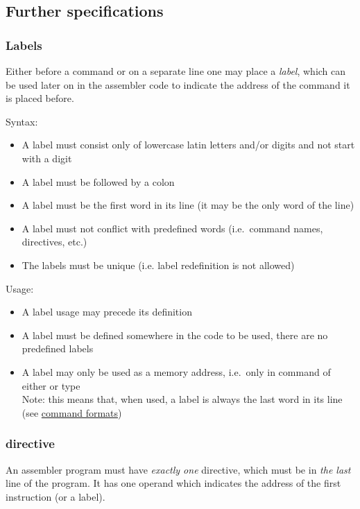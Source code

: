 \subsection{Further specifications}

\subsubsection{Labels}

Either before a command or on a separate line one may place a \textit{label}, which can be used later on in the assembler code to indicate the address of the command it is placed before.

Syntax:

\begin{itemize}
    \item A label must consist only of lowercase latin letters and/or digits and not start with a digit
    \item A label must be followed by a colon
    \item A label must be the first word in its line (it may be the only word of the line)
    \item A label must not conflict with predefined words (i.e.\ command names, directives, etc.)
    \item The labels must be unique (i.e. label redefinition is not allowed)
\end{itemize}

Usage:

\begin{itemize}
    \item A label usage may precede its definition
    \item A label must be defined somewhere in the code to be used, there are no predefined labels
    \item A label may only be used as a memory address, i.e.\ only in command of either  or  type\\
    Note: this means that, when used, a label is always the last word in its line (see \hyperlink{command:formats}{command formats})
\end{itemize}

\subsubsection{ directive}

An assembler program must have \textit{exactly one}  directive, which must be in \textit{the last} line of the program.
It has one operand which indicates the address of the first instruction (or a label).

